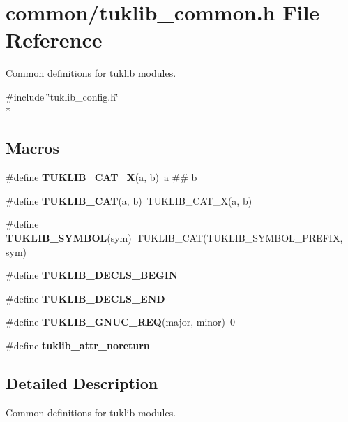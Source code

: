 \section{common/tuklib\-\_\-common.h File Reference}
\label{tuklib__common_8h}


Common definitions for tuklib modules.  


{\ttfamily \#include \char`\"{}tuklib\-\_\-config.\-h\char`\"{}}\\*
\subsection*{Macros}
\begin{DoxyCompactItemize}
\item 
\#define {\bfseries T\-U\-K\-L\-I\-B\-\_\-\-C\-A\-T\-\_\-\-X}(a, b)~a \#\# b\label{tuklib__common_8h_a8478e05dae8737dc11592c2788d11f90}

\item 
\#define {\bfseries T\-U\-K\-L\-I\-B\-\_\-\-C\-A\-T}(a, b)~T\-U\-K\-L\-I\-B\-\_\-\-C\-A\-T\-\_\-\-X(a, b)\label{tuklib__common_8h_a248ea0f7af459d76fa18f480421e9889}

\item 
\#define {\bfseries T\-U\-K\-L\-I\-B\-\_\-\-S\-Y\-M\-B\-O\-L}(sym)~T\-U\-K\-L\-I\-B\-\_\-\-C\-A\-T(T\-U\-K\-L\-I\-B\-\_\-\-S\-Y\-M\-B\-O\-L\-\_\-\-P\-R\-E\-F\-I\-X, sym)\label{tuklib__common_8h_a73d9617a3efe9601ef5017ae3edcd0d2}

\item 
\#define {\bfseries T\-U\-K\-L\-I\-B\-\_\-\-D\-E\-C\-L\-S\-\_\-\-B\-E\-G\-I\-N}\label{tuklib__common_8h_ab5023d03fa57f2c87a47dcbe2c1f09fa}

\item 
\#define {\bfseries T\-U\-K\-L\-I\-B\-\_\-\-D\-E\-C\-L\-S\-\_\-\-E\-N\-D}\label{tuklib__common_8h_a563a246f5a3c60ca4c93e67c8022974a}

\item 
\#define {\bfseries T\-U\-K\-L\-I\-B\-\_\-\-G\-N\-U\-C\-\_\-\-R\-E\-Q}(major, minor)~0\label{tuklib__common_8h_a4ffc6c3ba0aaf18054d134112a7271c2}

\item 
\#define {\bfseries tuklib\-\_\-attr\-\_\-noreturn}\label{tuklib__common_8h_a7a86ab3b44072fe3421b321f74878910}

\end{DoxyCompactItemize}


\subsection{Detailed Description}
Common definitions for tuklib modules. 